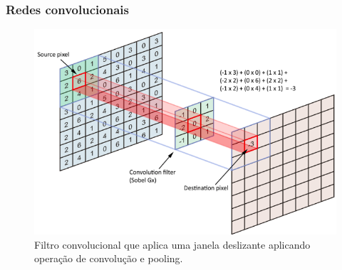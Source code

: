 \documentclass{beamer}
\begin{document}
\begin{frame}
    \frametitle{Redes convolucionais}
        \begin{figure}[!ht]
            \centering
            \includegraphics[width=0.6\columnwidth]{
                Imagens/operacao_conv.png
            }
            \caption{
         Filtro convolucional que aplica uma janela deslizante aplicando operação de convolução e pooling.  
            }
            \label{fig:conv}
        \end{figure}        




\end{frame}
\end{document}
